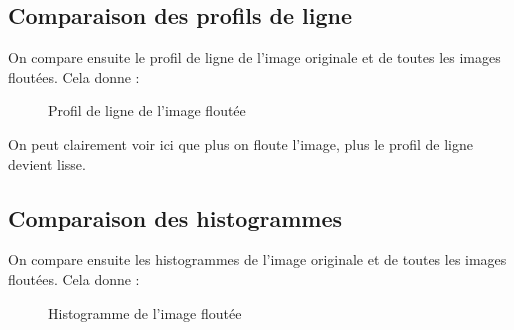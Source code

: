 \documentclass[french,a4paper,10pt]{article}
\begin{document}
    \newpage
    \subsection{Comparaison des profils de ligne}\label{subsec:4.3}

    On compare ensuite le profil de ligne de l'image originale et de toutes les images floutées.
    Cela donne :
    \begin{figure}[!htb]
        \centering
        \caption{Profil de ligne de l'image floutée}\label{Fig:prof-peppers-grey-ff2}
    \end{figure}

    On peut clairement voir ici que plus on floute l'image, plus le profil de ligne devient lisse.

    \newpage
    \subsection{Comparaison des histogrammes}\label{subsec:4.4}

    On compare ensuite les histogrammes de l'image originale et de toutes les images floutées.
    Cela donne :
    \begin{figure}[!htb]
        \centering
        \caption{Histogramme de l'image floutée}\label{Fig:histo-peppers-grey-ff2}
    \end{figure}
\end{document}
